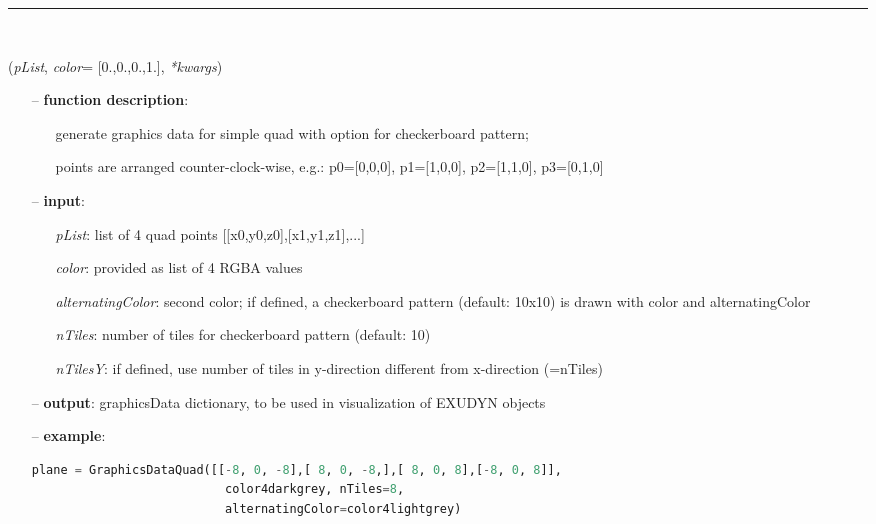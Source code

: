 \begin{itemize}[leftmargin=1.4cm]
\begin{itemize}[leftmargin=1.4cm]
\begin{itemize}[leftmargin=1.4cm]
\begin{itemize}[leftmargin=0.5cm]
\begin{itemize}[leftmargin=1.4cm]
\begin{itemize}[leftmargin=1.4cm]
\begin{itemize}[leftmargin=0.5cm]
\begin{itemize}[leftmargin=1.4cm]
\begin{itemize}[leftmargin=0.5cm]
%
\noindent\rule{8cm}{0.75pt}\vspace{1pt} \\ 
\begin{flushleft}
\label{sec:graphicsDataUtilities:GraphicsDataQuad}
({\it pList}, {\it color}= [0.,0.,0.,1.], {\it **kwargs})
\end{flushleft}
\setlength{\itemindent}{0.7cm}
\begin{itemize}[leftmargin=0.7cm]
\item[--]
{\bf function description}: \vspace{-6pt}
\begin{itemize}[leftmargin=1.2cm]
\setlength{\itemindent}{-0.7cm}
\item[]generate graphics data for simple quad with option for checkerboard pattern;
\item[]points are arranged counter-clock-wise, e.g.: p0=[0,0,0], p1=[1,0,0], p2=[1,1,0], p3=[0,1,0]
\end{itemize}
\item[--]
{\bf input}: \vspace{-6pt}
\begin{itemize}[leftmargin=1.2cm]
\setlength{\itemindent}{-0.7cm}
\item[]{\it pList}: list of 4 quad points [[x0,y0,z0],[x1,y1,z1],...]
\item[]{\it color}: provided as list of 4 RGBA values
\item[]{\it alternatingColor}: second color; if defined, a checkerboard pattern (default: 10x10) is drawn with color and alternatingColor
\item[]{\it nTiles}: number of tiles for checkerboard pattern (default: 10)
\item[]{\it nTilesY}: if defined, use number of tiles in y-direction different from x-direction (=nTiles)
\end{itemize}
\item[--]
{\bf output}: graphicsData dictionary, to be used in visualization of EXUDYN objects
\item[--]
{\bf example}: \vspace{-12pt}\ei\begin{lstlisting}[language=Python, xleftmargin=36pt]
  plane = GraphicsDataQuad([[-8, 0, -8],[ 8, 0, -8,],[ 8, 0, 8],[-8, 0, 8]],
                           color4darkgrey, nTiles=8,
                           alternatingColor=color4lightgrey)

\end{lstlisting}
\end{itemize}
\end{itemize}
\end{itemize}
\end{itemize}
\end{itemize}
\end{itemize}
\end{itemize}
\end{itemize}
\end{itemize}
\end{itemize}
